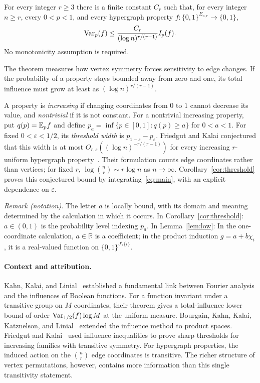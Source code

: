 \begin{theorem}\label{thm:main}
For every integer $r\ge3$ there is a finite constant $C_r$ such that,
for every integer $n\ge r$, every $0<p<1$, and every hypergraph property
$f:\{0,1\}^{E_{n,r}}\to\{0,1\}$,
\begin{equation}\label{eq:main}
 \operatorname{Var}_p(f)\le \frac{C_r}{(\log n)^{r/(r-1)}}I_p(f).
\end{equation}
No monotonicity assumption is required.
\end{theorem}

The theorem measures how vertex symmetry forces sensitivity to edge
changes. If the probability of a property stays bounded away from
zero and one, its total influence must grow at least as
$(\log n)^{r/(r-1)}$.

A property is \emph{increasing} if changing coordinates from $0$ to
$1$ cannot decrease its value, and \emph{nontrivial} if it is not
constant. For a nontrivial increasing property, put $q(p)=\mathbb E_p f$
and define $p_a=\inf\{p\in[0,1]:q(p)\ge a\}$ for $0<a<1$.
For fixed $0<\varepsilon<1/2$, its \emph{threshold width} is
$p_{1-\varepsilon}-p_\varepsilon$.
Friedgut and Kalai conjectured that this width is at most
$O_{r,\varepsilon}((\log n)^{-r/(r-1)})$ for every increasing
$r$-uniform hypergraph property~\cite[Section~5, p.~2999]{FK96}.
Their formulation counts edge coordinates rather than vertices;
for fixed $r$, $\log\binom nr\sim r\log n$ as $n\to\infty$.
Corollary~\ref{cor:threshold} proves this conjectured bound by
integrating~\eqref{eq:main}, with an explicit dependence on
$\varepsilon$.

\noindent\textit{Remark (notation).} The letter $a$ is locally bound, with its domain and meaning determined by the calculation in which it occurs. In Corollary~\ref{cor:threshold}: $a\in(0,1)$ is the probability level indexing $p_a$. In Lemma~\ref{lem:low}: In the one-coordinate calculation, $a\in\mathbb R$ is a coefficient; in the product induction $g=a+b\chi_i$, it is a real-valued function on $\{0,1\}^{J\setminus\{i\}}$.


\paragraph{Context and attribution.}
Kahn, Kalai, and Linial~\cite{KKL88} established a fundamental link
between Fourier analysis and the influences of Boolean functions.
For a function invariant under a transitive group on $M$ coordinates,
their theorem gives a total-influence lower bound of order
$\operatorname{Var}_{1/2}(f)\log M$ at the uniform measure.
Bourgain, Kahn, Kalai, Katznelson, and Linial~\cite{BKKKL92}
extended the influence method to product spaces.
Friedgut and Kalai~\cite{FK96} used influence inequalities to prove
sharp thresholds for increasing families with transitive symmetry.
For hypergraph properties, the induced action on the
$\binom nr$ edge coordinates is transitive. The richer structure of
vertex permutations, however, contains more information than this
single transitivity statement.

